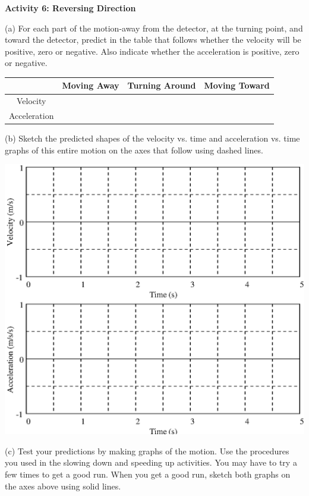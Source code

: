 \textbf{Activity 6: Reversing Direction }

(a) For each part of the motion-away from the detector, at the turning point,
and toward the detector, predict in the table that follows whether the velocity
will be positive, zero or negative. Also indicate whether the acceleration is
positive, zero or negative.

\vspace{0.3cm}
{\centering \begin{tabular}{|c|c|c|c|}
\hline 
&
Moving Away&
Turning Around&
Moving Toward\\
\hline 
Velocity&
&
&
\\
\hline 
Acceleration&
&
&
\\
\hline 
\end{tabular}\par}
\vspace{0.3cm}

(b) Sketch the predicted shapes of the velocity vs. time and acceleration vs.
time graphs of this entire motion on the axes that follow using dashed lines.

\vspace{0.3cm}
{\par\centering \includegraphics{slowing/slowing_fig5.eps} \par}
\vspace{13mm}

(c) Test your predictions by making graphs of the motion. Use the procedures
you used in the slowing down and speeding up activities. You may have to try
a few times to get a good run. When you get a good run, sketch both graphs on the axes above using solid lines.

